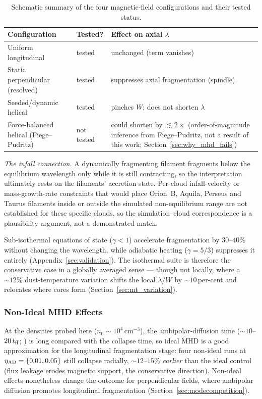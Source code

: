 \documentclass[usenatbib,twoside,twocolumn]{mnras}
\begin{document}
\begin{table}
\caption{Schematic summary of the four magnetic-field configurations and their tested status.}
\label{tab:magcases}
\footnotesize
\setlength{\tabcolsep}{4pt}
\begin{tabular}{@{}p{2.9cm}lp{3.0cm}@{}}
\toprule
Configuration & Tested? & Effect on axial $\lambda$ \\
\midrule
Uniform longitudinal & tested & unchanged (term vanishes) \\
Static perpendicular (resolved) & tested & suppresses axial fragmentation (spindle) \\
Seeded/dynamic helical & tested & pinches $W$; does not shorten $\lambda$ \\
Force-balanced helical (Fiege--Pudritz) & not tested & could shorten by $\lesssim2\times$ (order-of-magnitude inference from Fiege--Pudritz, not a result of this work; Section~\ref{sec:why_mhd_fails}) \\
\bottomrule
\end{tabular}
\end{table}

\emph{The infall connection.} A dynamically fragmenting filament fragments below the equilibrium wavelength only while it is still contracting, so the interpretation ultimately rests on the filaments' accretion state. Per-cloud infall-velocity or mass-growth-rate constraints that would place Orion~B, Aquila, Perseus and Taurus filaments inside or outside the simulated non-equilibrium range are not established for these specific clouds, so the simulation--cloud correspondence is a plausibility argument, not a demonstrated match.

Sub-isothermal equations of state ($\gamma<1$) accelerate fragmentation by $30$--$40\%$ without changing the wavelength, while adiabatic heating ($\gamma=5/3$) suppresses it entirely (Appendix~\ref{sec:validation}). The isothermal suite is therefore the conservative case in a globally averaged sense --- though not locally, where a $\sim12\%$ dust-temperature variation shifts the local $\lambda/W$ by $\sim10$\,per-cent and relocates where cores form (Section~\ref{sec:mt_variation}).

\subsubsection{Non-Ideal MHD Effects}
\label{sec:nonideal}

At the densities probed here ($n_0\sim10^4$\,cm$^{-3}$), the ambipolar-diffusion time ($\sim10$--$20\,t_{\rm ff}$; \citealt{Tassis2004}) is long compared with the collapse time, so ideal MHD is a good approximation for the longitudinal fragmentation stage: four non-ideal runs at $\eta_{\rm AD}=\{0.01,0.05\}$ still collapse radially, $\sim12$--$15\%$ \textit{earlier} than the ideal control (flux leakage erodes magnetic support, the conservative direction). Non-ideal effects nonetheless change the outcome for perpendicular fields, where ambipolar diffusion promotes longitudinal fragmentation (Section~\ref{sec:modecompetition}).
\end{document}
